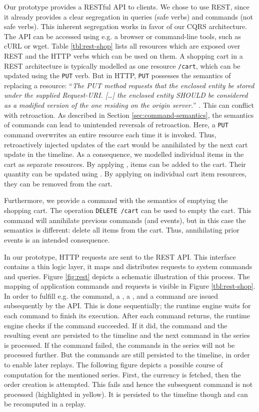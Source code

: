 Our prototype provides a RESTful API to clients. We chose to use REST, since it 
already provides a clear segregation in queries (safe verbs) and commands (not 
safe verbs). This inherent segregation works in favor of our CQRS architecture. 
The API can be accessed using e.g. a browser or command-line tools, such as cURL 
or wget. 
Table \ref{tbl:rest-shop} lists all resources which are exposed over REST and 
the HTTP verbs which can be used on them. 
%
A shopping cart in a REST architecture is typically modelled as one resource 
\texttt{/cart}, which can be updated using the \texttt{PUT} verb. But in HTTP, 
\texttt{PUT} possesses the semantics of replacing a resource: 
``\emph{The PUT method requests that the enclosed entity be stored under the
supplied Request-URI. [\dots{}] the enclosed entity SHOULD be considered as a 
modified version of the one residing on the origin server.}'' \cite{RFC2616}.
%
This can conflict with retroaction.
As described in Section \ref{sec:command-semantics}, the semantics of commands 
can lead to unintended reversals of retroaction. Here, a \texttt{PUT} command 
overwrites an entire resource each time it is invoked. Thus, retroactively 
injected updates of the cart would be annihilated by the next cart update in 
the timeline.
As a consequence, we modelled individual items in the cart as separate 
resources. By applying , items can be added to the cart. Their 
quantity can be updated using .
By applying  on individual cart item resources, they can be removed 
from the cart.

Furthermore, we provide a command with the semantics of emptying the shopping
cart. The operation \texttt{DELETE /cart} can be used to empty the cart. 
This command will annihilate previous  commands (and events), 
but in this case the semantics is different: delete all items from the cart.
Thus, annihilating prior events is an intended consequence.

In our prototype, HTTP requests are sent to the REST API. This interface 
contains a thin logic layer, it maps and distributes requests to system 
commands and queries.
Figure \ref{fig:rest} depicts a schematic illustration of this process. 
The mapping of application commands and requests is visible in Figure 
\ref{tbl:rest-shop}. In order to fulfill e.g. the  command, 
a , a , and a  
command are issued subsequently by the API. 
This is done sequentially; the runtime engine waits for each command to finish 
its execution.
After each command returns, the runtime engine checks if the command succeeded. 
If it did, the command and the resulting event are persisted to the timeline and
the next command in the series is processed. If the command failed, the commands 
in the series will not be processed further. But the commands are still persisted 
to the timeline, in order to enable later replays. 
The following figure depicts a possible course of computation for the mentioned 
series. First, the currency is fetched, then the order creation is attempted. 
This fails and hence the subsequent  command is not 
processed (highlighted in yellow). It is persisted to the timeline though and 
can be recomputed in a replay.

